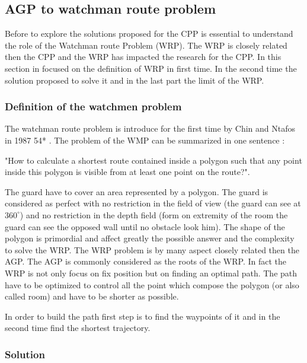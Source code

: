 \subsection{AGP  to watchman route problem}


Before to explore the solutions proposed for the CPP is essential to understand the  role of the Watchman route Problem (WRP). The WRP is closely related then the CPP  and  the WRP has impacted the research for the CPP. 
 In this section in focused on the definition of WRP in first time. In the second time the solution proposed to solve it and in the last part the limit of the WRP.

\subsubsection{Definition of the watchmen problem }

The watchman route problem is introduce for the first time by Chin and Ntafos in 1987 54* \cite{54chin}. The problem of the WMP can be summarized in one sentence :

"How to calculate a shortest route contained inside a polygon such that any point inside this polygon is visible from at least one point on the route?".  

The guard have to cover an area represented by a polygon. The guard is considered as perfect with no restriction in the field of view (the guard can see at $360^\circ$) and no restriction in the depth field (form on extremity of the room the guard can see the opposed wall until no obstacle look him). 
The shape of the polygon is primordial and affect greatly the possible answer and the complexity to solve the WRP.
The WRP problem is by many aspect  closely related then  the AGP. The AGP is commonly considered as the roots of the WRP.
 In fact the  WRP is not only focus on fix position but on finding an optimal path. The path have to be optimized  to control  all the point  which  compose the polygon (or also called room)  and have to be shorter as possible.
 
  In order to build the path first step is to find the waypoints of it and in the second time find the  shortest trajectory.


 
\subsubsection{Solution} 

